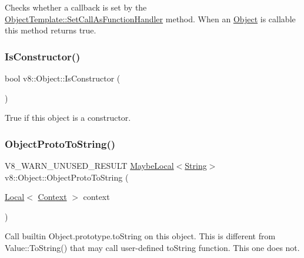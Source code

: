 Checks whether a callback is set by the \mbox{\hyperlink{classv8_1_1ObjectTemplate_a1775c8f73e643c339804d2f5b628eddf}{Object\+Template\+::\+Set\+Call\+As\+Function\+Handler}} method. When an \mbox{\hyperlink{classv8_1_1Object}{Object}} is callable this method returns true. \mbox{\label{classv8_1_1Object_a257233cb6b11dc7bb5a0e8df8695e889}} 
\subsubsection{\texorpdfstring{Is\+Constructor()}{IsConstructor()}}
{\footnotesize\ttfamily bool v8\+::\+Object\+::\+Is\+Constructor (\begin{DoxyParamCaption}{ }\end{DoxyParamCaption})}

True if this object is a constructor. \mbox{\label{classv8_1_1Object_a7a65552d78eff4a1b9755f99167f4255}} 
\subsubsection{\texorpdfstring{Object\+Proto\+To\+String()}{ObjectProtoToString()}}
{\footnotesize\ttfamily V8\+\_\+\+W\+A\+R\+N\+\_\+\+U\+N\+U\+S\+E\+D\+\_\+\+R\+E\+S\+U\+LT \mbox{\hyperlink{classv8_1_1MaybeLocal}{Maybe\+Local}}$<$\mbox{\hyperlink{classv8_1_1String}{String}}$>$ v8\+::\+Object\+::\+Object\+Proto\+To\+String (\begin{DoxyParamCaption}\item[{\mbox{\hyperlink{classv8_1_1Local}{Local}}$<$ \mbox{\hyperlink{classv8_1_1Context}{Context}} $>$}]{context }\end{DoxyParamCaption})}

Call builtin Object.\+prototype.\+to\+String on this object. This is different from Value\+::\+To\+String() that may call user-\/defined to\+String function. This one does not. \mbox{\label{classv8_1_1Object_a6705d705f6ddb941100a46875609c63a}} 
